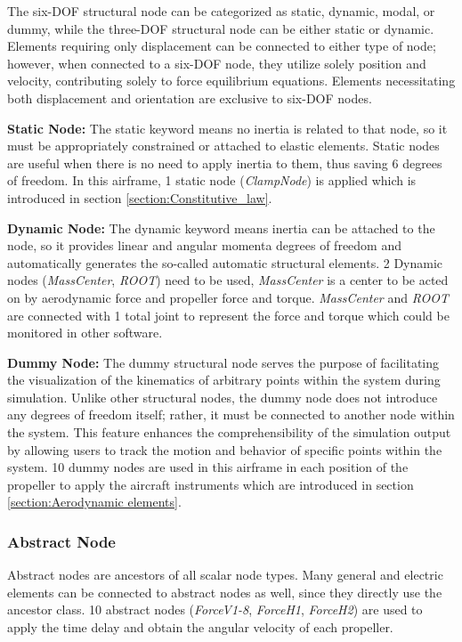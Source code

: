 The six-DOF structural node can be categorized as static, dynamic, modal, or dummy, while the three-DOF structural node can be either static or dynamic. Elements requiring only displacement can be connected to either type of node; however, when connected to a six-DOF node, they utilize solely position and velocity, contributing solely to force equilibrium equations. Elements necessitating both displacement and orientation are exclusive to six-DOF nodes.

\textbf{Static Node:} The static keyword means no inertia is related to that node, so it must be appropriately constrained or attached to elastic elements. Static nodes are useful when there is no need to apply inertia to them, thus saving 6 degrees of freedom. In this airframe, 1 static node (\textit{ClampNode}) is applied which is introduced in section \ref{section:Constitutive_law}.

\textbf{Dynamic Node:} The dynamic keyword means inertia can be attached to the node, so it provides linear and angular momenta degrees of freedom and automatically generates the so-called automatic structural elements. 2 Dynamic nodes (\textit{MassCenter}, \textit{ROOT}) need to be used, \textit{MassCenter} is a center to be acted on by aerodynamic force and propeller force and torque. \textit{MassCenter} and \textit{ROOT} are connected with 1 total joint to represent the force and torque which could be monitored in other software.

\textbf{Dummy Node:} The dummy structural node serves the purpose of facilitating the visualization of the kinematics of arbitrary points within the system during simulation. Unlike other structural nodes, the dummy node does not introduce any degrees of freedom itself; rather, it must be connected to another node within the system. This feature enhances the comprehensibility of the simulation output by allowing users to track the motion and behavior of specific points within the system. 10 dummy nodes are used in this airframe in each position of the propeller to apply the aircraft instruments which are introduced in section \ref{section:Aerodynamic elements}.

\subsubsection{Abstract Node}
Abstract nodes are ancestors of all scalar node types. Many general and electric elements can be connected to abstract nodes as well, since they directly use the ancestor class. 10 abstract nodes (\textit{ForceV1-8}, \textit{ForceH1}, \textit{ForceH2}) are used to apply the time delay and obtain the angular velocity of each propeller.

